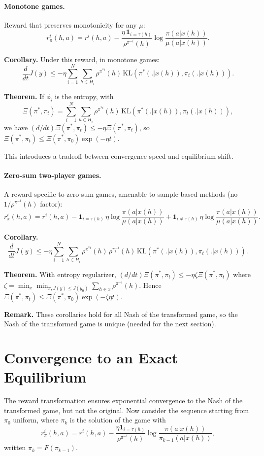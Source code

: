 \paragraph{Monotone games.}
Reward that preserves monotonicity for any $\mu$:
$$r^i_\pi(h, a) = r^i(h, a) - \frac{\eta\, \mathbf{1}_{i=\tau(h)}}{\rho^{\pi^{-i}}(h)} \log \frac{\pi(a|x(h))}{\mu(a|x(h))}.$$

\textbf{Corollary.} Under this reward, in monotone games:
$$\frac{d}{dt}J(y)  \leq - \eta \sum_{i=1}^N \sum_{h \in H_i} \rho^{\pi^{*i}}(h)\, \textrm{KL}(\pi^*(.|x(h)), \pi_t(.|x(h))).$$

\textbf{Theorem.} If $\phi_i$ is the entropy, with
$$\Xi(\pi^*, \pi_t) = \sum_{i=1}^N \sum_{h \in H_i} \rho^{\pi^{*i}}(h)\, \textrm{KL}(\pi^*(.|x(h)), \pi_t(.|x(h))),$$
we have $(d/dt)\Xi(\pi^*,\pi_t)\leq -\eta \Xi(\pi^*,\pi_t)$, so $\Xi(\pi^*,\pi_t) \leq \Xi(\pi^*,\pi_0) \exp(-\eta t)$.

This introduces a tradeoff between convergence speed and equilibrium shift.

\paragraph{Zero-sum two-player games.}
A reward specific to zero-sum games, amenable to sample-based methods (no $1/\rho^{\pi^{-i}}(h)$ factor):
$$r^i_\pi(h, a) = r^i(h, a) - \mathbf{1}_{i=\tau(h)}\, \eta \log \frac{\pi(a|x(h))}{\mu(a|x(h))} + \mathbf{1}_{i\neq\tau(h)}\, \eta \log \frac{\pi(a|x(h))}{\mu(a|x(h))}.$$

\textbf{Corollary.}
$$\frac{d}{dt}J(y) \leq - \eta \sum_{i=1}^N \sum_{h \in H_i} \rho^{\pi^{*i}}(h)\,\rho^{\pi_t^{-i}}(h)\, \textrm{KL}(\pi^*(.|x(h)), \pi_t(.|x(h))).$$

\textbf{Theorem.} With entropy regularizer, $(d/dt)\Xi(\pi^*, \pi_t) \leq -\eta \zeta \Xi(\pi^*, \pi_t)$ where $\zeta = \min_{x} \min_{\pi, J(y)\leq J(y_0)} \sum_{h \in x} \rho^{\pi^{-i}}(h)$. Hence $\Xi(\pi^*, \pi_t) \leq \Xi(\pi^*, \pi_0) \exp(-\zeta\eta t)$.

\textbf{Remark.} These corollaries hold for all Nash of the transformed game, so the Nash of the transformed game is unique (needed for the next section).

\section{Convergence to an Exact Equilibrium}
The reward transformation ensures exponential convergence to the Nash of the transformed game, but not the original. Now consider the sequence starting from $\pi_0$ uniform, where $\pi_k$ is the solution of the game with
$$r^i_\pi(h, a) = r^i(h, a) - \frac{\eta \mathbf{1}_{i=\tau(h)}}{\rho^{\pi^{-i}}(h)} \log \frac{\pi(a|x(h))}{\pi_{k-1}(a|x(h))},$$
written $\pi_k = F(\pi_{k-1})$.

